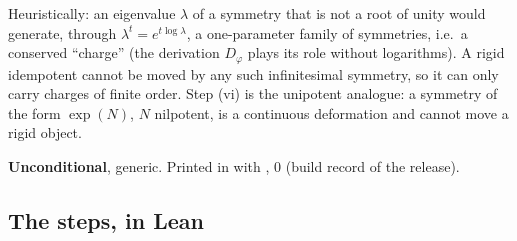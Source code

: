 \begin{physics}
Heuristically: an eigenvalue $\lambda$ of a symmetry that is not a root of unity would generate, through
$\lambda^t=e^{t\log\lambda}$, a one-parameter family of symmetries, i.e.\ a conserved ``charge'' (the derivation $D_\varphi$
plays its role without logarithms).  A rigid idempotent cannot be moved by any such infinitesimal symmetry, so it can only
carry charges of finite order.  Step (vi) is the unipotent analogue: a symmetry of the form $\exp(N)$, $N$ nilpotent, is a
continuous deformation and cannot move a rigid object.
\end{physics}
\begin{status}
\textbf{Unconditional}, generic.  Printed in  with
, 0  (build record of the release).
\end{status}

\subsection{The steps, in Lean}

